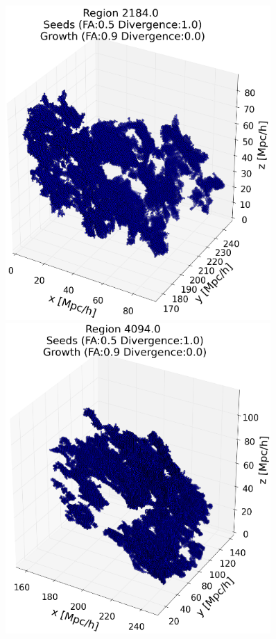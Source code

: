 \documentclass[12pt]{article}
\begin{document}
\begin{figure}[ht]
\centering
\begin{minipage}{.5\textwidth}
  \centering
  \includegraphics[width=0.9\textwidth]{groups/3d/seeds_FA_5/region_2184_small_seeds_FA_05_Trace_10_search_FA_09_Trace_00_.png} %
\end{minipage}%
\begin{minipage}{.5\textwidth}
  \centering
  \includegraphics[width=0.9\textwidth]{groups/3d/seeds_FA_5/region_4094_small_seeds_FA_05_Trace_10_search_FA_09_Trace_00_.png}

\end{minipage}
\end{figure}
\end{document}
